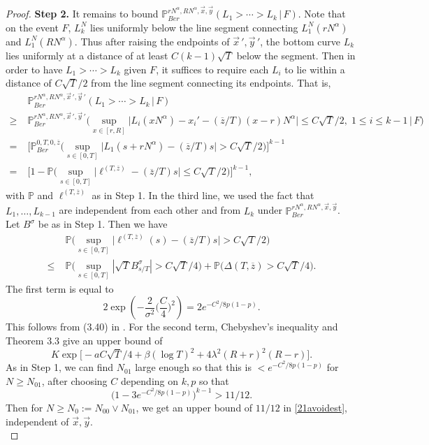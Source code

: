 \begin{proof}
		\noindent\textbf{Step 2.} It remains to bound $\mathbb{P}^{rN^\alpha, RN^\alpha,\vec{x},\vec{y}}_{Ber} (L_1 > \cdots > L_k\,|\,F)$. Note that on the event $F$, $L_k^N$ lies uniformly below the line segment connecting $L_1^N(rN^\alpha)$ and $L_1^N(RN^\alpha)$. Thus after raising the endpoints of $\vec{x}\,',\vec{y}\,'$, the bottom curve $L_k$ lies uniformly at a distance of at least $C(k-1)\sqrt{T}$ below the segment. Then in order to have $L_1 > \cdots > L_k$ given $F$, it suffices to require each $L_i$ to lie within a distance of $C\sqrt{T}/2$ from the line segment connecting its endpoints. That is,
		\begin{align}
		&\mathbb{P}^{rN^\alpha, RN^\alpha,\vec{x}\,',\vec{y}\,'}_{Ber} (L_1 > \cdots > L_k\,|\,F) \nonumber\\
		\geq \; & \mathbb{P}^{rN^\alpha, RN^\alpha,\vec{x}\,',\vec{y}\,'}_{Ber} \Big(\sup_{x\in[r,R]} \big|L_i(xN^\alpha) - x_i' - (\overline{z}/T)(x-r)N^\alpha\big| \leq C\sqrt{T}/2, \;1\leq i\leq k-1\,\Big|\,F\Big) \nonumber\\
		= \; & \Big[ \mathbb{P}^{0,T,0,\overline{z}}_{Ber} \Big(\sup_{s\in[0,T]} \big|L_1(s+rN^\alpha) - (\overline{z}/T)s\big| > C\sqrt{T}/2\Big)\Big]^{k-1} \nonumber\\
		= \; & \Big[ 1 - \mathbb{P}\Big(\sup_{s\in[0,T]} \big|\ell^{(T,\overline{z})} - (\overline{z}/T)s\big| \leq C\sqrt{T}/2\Big)\Big]^{k-1}, \label{21avoidest}
		\end{align}
		with $\mathbb{P}$ and $\ell^{(T,\overline{z})}$ as in Step 1. In the third line, we used the fact that $L_1,\dots,L_{k-1}$ are independent from each other and from $L_k$ under $\mathbb{P}^{rN^\alpha, RN^\alpha,\vec{x},\vec{y}}_{Ber}$. Let $B^\sigma$ be as in Step 1. Then we have
		\begin{align*}
		&\mathbb{P} \Big(\sup_{s\in[0,T]} \big|\ell^{(T,\overline{z})}(s) - (\overline{z}/T)s\big| > C\sqrt{T}/2\Big)\\
		\leq \; & \mathbb{P}\Big(\sup_{s\in[0,T]} |\sqrt{T}B^{\sigma}_{s/T}| > C\sqrt{T}/4\Big) + \mathbb{P}\Big(\Delta(T,\overline{z}) > C\sqrt{T}/4\Big).
		\end{align*}
		The first term is equal to
		\[
		2\exp\left(-\frac{2}{\sigma^2}\Big(\frac{C}{4}\Big)^2\right) = 2e^{-C^2/8p(1-p)}.
		\]
		This follows from (3.40) in \cite[Chapter 4]{KS}. For the second term, Chebyshev's inequality and Theorem 3.3 give an upper bound of
		\[
		K\exp\Big[-aC\sqrt{T}/4 + \beta(\log T)^2 + 4\lambda^2(R+r)^2(R-r) \Big].
		\]
		As in Step 1, we can find $N_{01}$ large enough so that this is $<e^{-C^2/8p(1-p)}$ for $N\geq N_{01}$, after choosing $C$ depending on $k,p$ so that
		\begin{equation}
		\big(1-3e^{-C^2/8p(1-p)}\big)^{k-1} > 11/12. \label{21Cineq}
		\end{equation}
		Then for $N\geq N_0 := N_{00} \vee N_{01}$, we get an upper bound of $11/12$ in \eqref{21avoidest}, independent of $\vec{x},\vec{y}$.\\
		

\end{proof}
